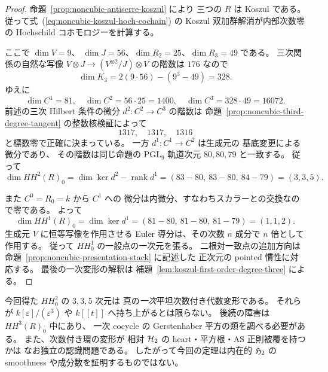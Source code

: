 \begin{proof}
命題~\ref{prop:noncubic-antiserre-koszul} により
三つの $R$ は Koszul である。
従って式~(\ref{eq:noncubic-koszul-hoch-cochain}) の
Koszul 双加群解消が内部次数零の
Hochschild コホモロジーを計算する。

ここで $\dim V=9$、
$\dim J=56$、$\dim R_2=25$、$\dim R_3=49$ である。
三次関係の自然な写像
$V\otimes J\to (V^{\otimes2}/J)\otimes V$
の階数は $176$ なので
\[
 \dim K_3
  =2(9\cdot56)-(9^3-49)=328.
\]
ゆえに
\[
 \dim C^1=81,\quad
 \dim C^2=56\cdot25=1400,\quad
 \dim C^3=328\cdot49=16072.
\]
前述の三次 Hilbert 条件の微分
$d^2:C^2\to C^3$ の階数は
命題~\ref{prop:noncubic-third-degree-tangent}
の整数核検証によって
\[
 1317,\quad1317,\quad1316
\]
と標数零で正確に決まっている。
一方 $d^1:C^1\to C^2$ は生成元の
基底変更による微分であり、
その階数は同じ命題の $\mathrm{PGL}_9$ 軌道次元
$80,80,79$ と一致する。
従って
\[
 \dim HH^2(R)_0
  =\dim\ker d^2-\operatorname{rank}d^1
  =(83-80,\ 83-80,\ 84-79)=(3,3,5).
\]

また $C^0=R_0=k$ から $C^1$ への
微分は内微分、すなわちスカラーとの交換なので零である。
よって
\[
 \dim HH^1(R)_0
 =\dim\ker d^1=(81-80,\ 81-80,\ 81-79)=(1,1,2).
\]
生成元 $V$ に恒等写像を作用させる
Euler 導分は、その次数 $n$ 成分で $n$ 倍として作用する。
従って $HH^1_0$ の一般点の一次元を張る。
二根対一致点の追加方向は
命題~\ref{prop:noncubic-presentation-stack} に記述した
正次元の pointed 慣性に対応する。
最後の一次変形の解釈は
補題~\ref{lem:koszul-first-order-degree-three} による。
\end{proof}

\begin{remark}[形式的な持上げと次数付き代数の局所模型]
今回得た $HH^2_0$ の $3,3,5$ 次元は
真の\emph{一次}平坦次数付き代数変形である。
それらが $k[\varepsilon]/(\varepsilon^3)$ や
$k[[t]]$ へ持ち上がるとは限らない。
後続の障害は $HH^3(R)_0$ 中にあり、
一次 cocycle の Gerstenhaber 平方の類を調べる必要がある。
また、次数付き環の変形が
相対 $\mathcal H_2$ の heart・平方根・AS 正則被覆を持つかは
なお独立の認識問題である。
したがって今回の定理は内在的 $\mathfrak H_2$
の smoothness や成分数を証明するものではない。
\end{remark}

